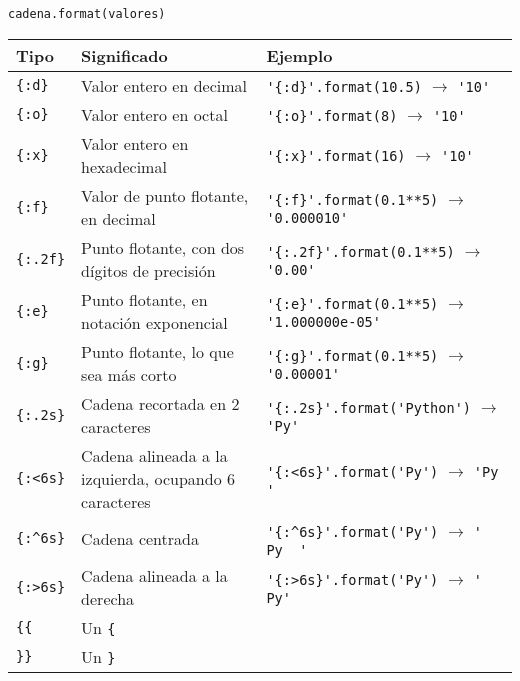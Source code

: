 \begin{referencia_python}
\begin{sintaxis}{\lstinline!cadena.format(valores)!}
\begin{center}
\begin{tabular}{l p{4cm} l}
 {\bf Tipo} & {\bf Significado} & {\bf Ejemplo} \\
\hline
\verb!{:d}! & {\footnotesize Valor entero en decimal} & \lstinline!'{:d}'.format(10.5)! $\rightarrow$ \lstinline!'10'! \\
\verb!{:o}! & {\footnotesize Valor entero en octal} & \lstinline!'{:o}'.format(8)! $\rightarrow$ \lstinline!'10'! \\
\verb!{:x}! & {\footnotesize Valor entero en hexadecimal} & \lstinline!'{:x}'.format(16)! $\rightarrow$ \lstinline!'10'! \\
\verb!{:f}! & {\footnotesize Valor de punto flotante, en decimal} &
  \lstinline!'{:f}'.format(0.1**5)! $\rightarrow$ \lstinline!'0.000010'! \\
\verb!{:.2f}! & {\footnotesize Punto flotante, con dos dígitos de precisión} &
  \lstinline!'{:.2f}'.format(0.1**5)! $\rightarrow$ \lstinline!'0.00'! \\
\verb!{:e}! & {\footnotesize Punto flotante, en notación exponencial} &
  \lstinline!'{:e}'.format(0.1**5)! $\rightarrow$ \lstinline!'1.000000e-05'! \\
\verb!{:g}! & {\footnotesize Punto flotante, lo que sea más corto} &
  \lstinline!'{:g}'.format(0.1**5)! $\rightarrow$ \lstinline!'0.00001'! \\
\verb!{:.2s}! & {\footnotesize Cadena recortada en 2 caracteres} &
  \lstinline!'{:.2s}'.format('Python')! $\rightarrow$ \lstinline!'Py'! \\
\verb!{:<6s}! & {\footnotesize Cadena alineada a la izquierda, ocupando 6 caracteres} &
  \lstinline!'{:<6s}'.format('Py')! $\rightarrow$ \lstinline!'Py    '! \\
\verb!{:^6s}! & {\footnotesize Cadena centrada} &
  \lstinline!'{:^6s}'.format('Py')! $\rightarrow$ \lstinline!'  Py  '! \\
\verb!{:>6s}! & {\footnotesize Cadena alineada a la derecha} &
  \lstinline!'{:>6s}'.format('Py')! $\rightarrow$ \lstinline!'    Py'! \\
\verb!{{! & {\footnotesize Un \verb!{!} \\
\verb!}}! & {\footnotesize Un \verb!}!} \\
\end{tabular}
\end{center}

\end{sintaxis}

\end{referencia_python}


